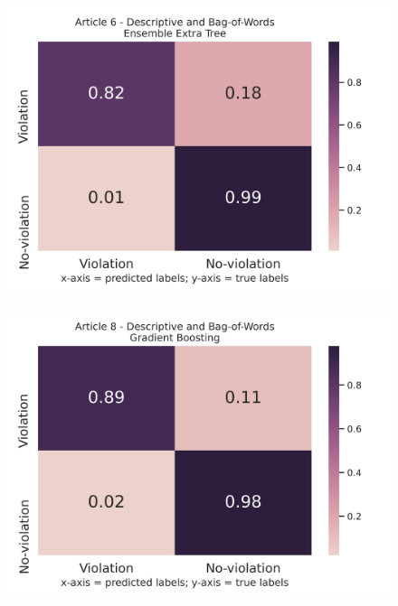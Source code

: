 \documentclass{article}
\begin{document}
\begin{figure}[!htb]
	\centering
    \includegraphics[scale=0.5]{data/analysis/cm/binary_cm_normalized_test_article_6.png}  
\end{figure}
\begin{figure}[!htb]
	\centering
    \includegraphics[scale=0.5]{data/analysis/cm/binary_cm_normalized_test_article_8.png}  
\end{figure}
\end{document}

